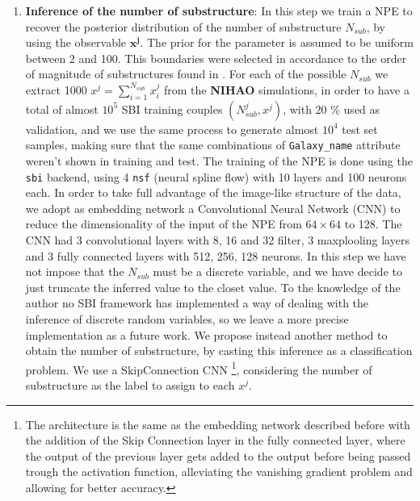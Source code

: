\begin{enumerate}
    \item \textbf{Inference of the number of substructure}: In this step we train a NPE to recover the posterior distribution of the number of substructure $N_{sub}$, by using the observable \textbf{$\mathbf{x^j}$}. The prior for the parameter is assumed to be uniform between 2 and 100. This boundaries were selected in accordance to the order of magnitude of substructures found in \cite{deasonUnravellingMassSpectrum2023}. For each of the possible $N_{sub}$ we extract 1000  $x^j = \sum_{i=1}^{N_{sub}} x_i^j$ from the \textbf{NIHAO} simulations, in order to have a total of almost $ 10^5$ SBI training couples $(N_{sub}^j, x^j)$, with 20 \% used as validation, and we use the same process to generate almost $10^4$ test set samples, making sure that the same combinations of \texttt{Galaxy\_name} attribute weren't shown in training and test. The training of the NPE is done using the \texttt{sbi} backend, using 4 \texttt{nsf} (neural spline flow) with 10 layers and 100 neurons each. In order to take full advantage of the image-like structure of the data, we adopt as embedding network a Convolutional Neural Network (CNN) to reduce the dimensionality of the input of the NPE from $64 \times 64$ to 128. The CNN had 3 convolutional layers with 8, 16 and 32 filter, 3 maxplooling layers and 3 fully connected layers with 512, 256, 128 neurons.
    In this step we have not impose that the $N_{sub}$ must be a discrete variable, and we have decide to just truncate the inferred value to the closet value. To the knowledge of the author no SBI framework has implemented a way of dealing with the inference of discrete random variables, so we leave a more precise implementation as a future work. We propose instead another method to obtain the number of substructure, by casting this inference as a classification problem. We use a SkipConnection CNN \footnote{The architecture is the same as the embedding network described before with the addition of the Skip Connection layer in the fully connected layer, where the output of the previous layer gets added to the output before being passed trough the activation function, alleviating the vanishing gradient problem and allowing for better accuracy.}, considering the number of substructure as the label to assign to each $x^j$.


\end{enumerate}
